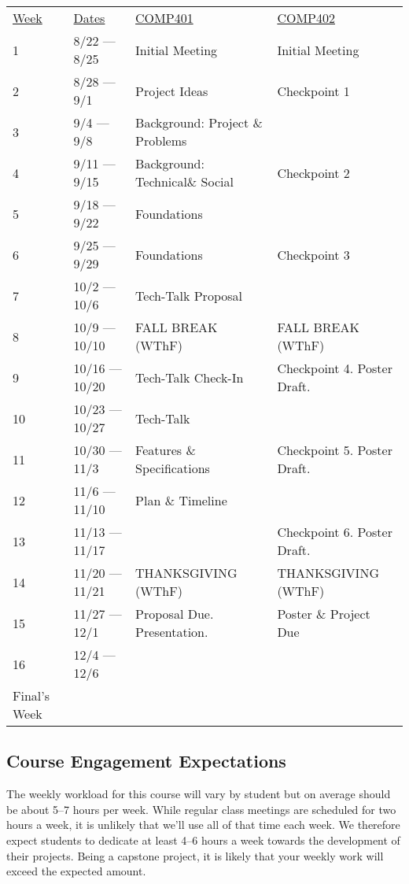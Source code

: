 \documentclass[nobib]{tufte-handout}
\begin{document}
\begin{center}
\begin{tabular}{llll}
\underline{Week} & \underline{Dates} &  \underline{COMP401} & \underline{COMP402}\\
1 & 8/22 --- 8/25 & Initial Meeting & Initial Meeting \\
2 & 8/28 --- 9/1 & Project Ideas & Checkpoint 1 \\
3 & 9/4 --- 9/8 & Background: Project \& Problems  & \\
4 & 9/11 --- 9/15 & Background: Technical\& Social  & Checkpoint 2 \\
5 & 9/18 --- 9/22 & Foundations & \\
6 & 9/25 --- 9/29 & Foundations & Checkpoint 3 \\
7 & 10/2 --- 10/6 & Tech-Talk Proposal & \\
8 & 10/9 --- 10/10 & FALL BREAK (WThF)  & FALL BREAK (WThF) \\
9 & 10/16 --- 10/20 & Tech-Talk Check-In & Checkpoint 4. Poster Draft. \\
10 & 10/23 --- 10/27 & Tech-Talk & \\
11 & 10/30 --- 11/3 &  Features \& Specifications &  Checkpoint 5. Poster Draft.\\
12 & 11/6 --- 11/10 & Plan \& Timeline & \\
13 & 11/13 --- 11/17 &  & Checkpoint 6. Poster Draft.\\
14 & 11/20 --- 11/21  & THANKSGIVING (WThF) & THANKSGIVING (WThF) \\
15 & 11/27 --- 12/1 & Proposal Due. Presentation. & Poster \& Project Due\\
16 & 12/4 --- 12/6 & & \\
Final's Week &  &  &  \\
\end{tabular}
\end{center}

\subsection{Course Engagement Expectations}

The weekly workload for this course will vary by student but on average should be about 5--7 hours per week.  While regular class meetings are scheduled for two hours a week, it is unlikely that we'll use all of that time each week.  We therefore expect students to dedicate at least 4--6 hours a week towards the development of their projects.  Being a capstone project, it is likely that your weekly work will exceed the expected amount.
\end{document}
